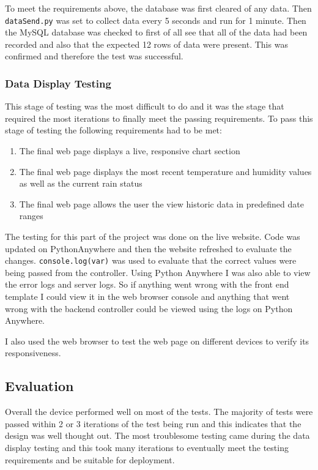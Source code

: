 \documentclass[10pt,a4paper]{article}
\begin{document}
To meet the requirements above, the database was first cleared of any data. Then \texttt{dataSend.py} was set to collect data every 5 seconds and run for 1 minute. Then the MySQL database was checked to first of all see that all of the data had been recorded and also that the expected 12 rows of data were present. This was confirmed and therefore the test was successful.

\subsubsection{Data Display Testing}
This stage of testing was the most difficult to do and it was the stage that required the most iterations to finally meet the passing requirements. To pass this stage of testing the following requirements had to be met:

\begin{enumerate}
  \item The final web page displays a live, responsive chart section
  \item The final web page displays the most recent temperature and humidity values as well as the current rain status
  \item The final web page allows the user the view historic data in predefined date ranges
\end{enumerate}

The testing for this part of the project was done on the live website. Code was updated on PythonAnywhere and then the website refreshed to evaluate the changes. \texttt{console.log(var)} was used to evaluate that the correct values were being passed from the controller. Using Python Anywhere I was also able to view the error logs and server logs. So if anything went wrong with the front end template I could view it in the web browser console and anything that went wrong with the backend controller could be viewed using the logs on Python Anywhere. 

I also used the web browser to test the web page on different devices to verify its responsiveness. 

\subsection{Evaluation}
Overall the device performed well on most of the tests. The majority of tests were passed within 2 or 3 iterations of the test being run and this indicates that the design was well thought out. The most troublesome testing came during the data display testing and this took many iterations to eventually meet the testing requirements and be suitable for deployment. 
\end{document}
